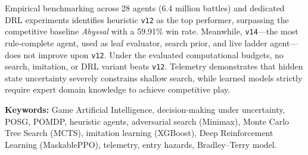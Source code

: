 Empirical benchmarking across 28 agents (6.4 million battles) and dedicated DRL experiments identifies heuristic \texttt{v12} as the top performer, surpassing the competitive baseline \textit{Abyssal} with a 59.91\% win rate. Meanwhile, \texttt{v14}—the most rule-complete agent, used as leaf evaluator, search prior, and live ladder agent—does not improve upon \texttt{v12}. Under the evaluated computational budgets, no search, imitation, or DRL variant beats \texttt{v12}. Telemetry demonstrates that hidden state uncertainty severely constrains shallow search, while learned models strictly require expert domain knowledge to achieve competitive play.

\vspace{0.3cm}
\noindent\textbf{Keywords:} Game Artificial Intelligence, decision-making under uncertainty, POSG, POMDP, heuristic agents, adversarial search (Minimax), Monte Carlo Tree Search (MCTS), imitation learning (XGBoost), Deep Reinforcement Learning (MaskablePPO), telemetry, entry hazards, Bradley--Terry model.
